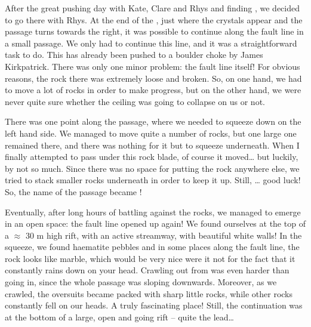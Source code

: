 After the great pushing day with Kate, Clare and Rhys and finding
, we decided to go there with Rhys. At the end of the
, just where the crystals appear and the passage
turns towards the right, it was possible to continue along the fault
line in a small passage. We only had to continue this line, and it was a
straightforward task to do. This has already been pushed to a boulder
choke by James Kirkpatrick. There was only one minor problem: the fault
line itself! For obvious reasons, the rock there was extremely loose and
broken. So, on one hand, we had to move a lot of rocks in order to make
progress, but on the other hand, we were never quite sure whether the
ceiling was going to collapse on us or not.


There was one point along the passage, where we needed to squeeze down
on the left hand side. We managed to move quite a number of rocks, but
one large one remained there, and there was nothing for it but to
squeeze underneath. When I finally attempted to pass under this rock
blade, of course it moved\ldots{} but luckily, by not so much. Since
there was no space for putting the rock anywhere else, we tried to stack
smaller rocks underneath in order to keep it up. Still, \ldots{} good luck! So, the name
of the passage became !

Eventually, after long hours of battling against the rocks, we managed
to emerge in an open space: the fault line opened up again! We found
ourselves at the top of a $\approx$ 30 m high rift, with an
active streamway, with beautiful white walls! In the squeeze, we found
haematite pebbles and in some places along the fault line, the rock
looks like marble, which would be very nice were it not for the fact
that it constantly rains down on your head. Crawling out from
 was even harder than going in, since the whole passage
was sloping downwards. Moreover, as we crawled, the oversuits became
packed with sharp little rocks, while other rocks constantly fell on our
heads. A truly fascinating place! Still, the continuation was at the
bottom of a large, open and going rift -- quite the lead\ldots{}

